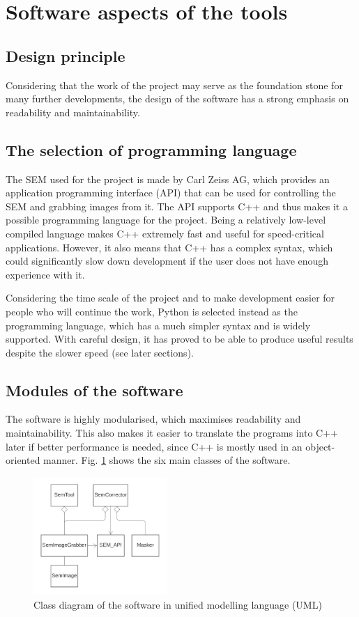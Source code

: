 \documentclass[12pt, conference]{IEEEtran}
\begin{document}
\section{Software aspects of the tools}
\subsection{Design principle}
Considering that the work of the project may serve as the foundation stone for many further developments, the design of the software has a strong emphasis on readability and maintainability.

\subsection{The selection of programming language}
The SEM used for the project is made by Carl Zeiss AG, which provides an application programming interface (API) that can be used for controlling the SEM and grabbing images from it. The API supports C++ and thus makes it a possible programming language for the project. Being a relatively low-level compiled language makes C++ extremely fast and useful for speed-critical applications. However, it also means that C++ has a complex syntax, which could significantly slow down development if the user does not have enough experience with it.

Considering the time scale of the project and to make development easier for people who will continue the work, Python is selected instead as the programming language, which has a much simpler syntax and is widely supported. With careful design, it has proved to be able to produce useful results despite the slower speed (see later sections).

\subsection{Modules of the software}
The software is highly modularised, which maximises readability and maintainability. This also makes it easier to translate the programs into C++ later if better performance is needed, since C++ is mostly used in an object-oriented manner. Fig. \ref{Software class diagram} shows the six main classes of the software.

\begin{figure}[htbp]
    \centering
    \includegraphics[width=0.45\textwidth]{Images/Software class diagram.png}
    \caption{Class diagram of the software in unified modelling language (UML)}
    \label{Software class diagram}
\end{figure}
\end{document}
